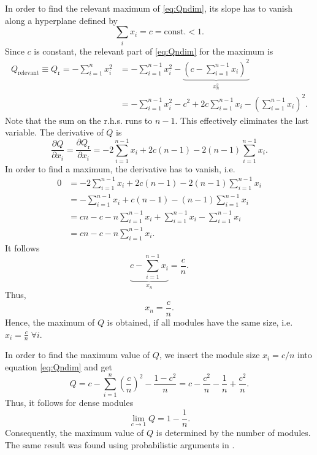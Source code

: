\documentclass[openright,twoside,headsepline]{scrbook}
\begin{document}
In order to find the relevant maximum of \eqref{eq:Qndim}, its slope has to vanish along a hyperplane defined by
\begin{equation}\label{qmehrdimbedingung}
\sum _i x_i = c = \text{const.} <1.
\end{equation}
%
Since $c$ is constant, the relevant part of \eqref{eq:Qndim} for the maximum is
\begin{align}
Q_{\text{relevant}}\equiv Q_\text{r}= -\sum _{i=1}^n x_i^2&=-\sum _{i=1}^{n-1} x_i^2- \underbrace{ \left( 
c-\sum _{i=1}^{n-1} x_i \right) ^2 }_{x_n^2} \label{eq:relevant_Q}\\
&= -\sum _{i=1}^{n-1} x_i^2 - c^2 + 2c\sum _{i=1}^{n-1} x_i -\left( \sum _{i=1}^{n-1} x_i \right) ^2. \nonumber
\end{align}
Note that the sum on the r.h.s. runs to $n-1$.
This effectively eliminates the last variable.
The derivative of $Q$ is
\begin{equation}
\frac{\partial Q}{\partial x_i}= \frac{\partial Q_\text{r}}{\partial x_i}=- 2\sum _{i=1}^{n-1} x_i + 2c(n-1)-2 (n-1) \sum _{i=1}^{n-1} x_i.
\end{equation}
%
In order to find a maximum, the derivative has to vanish, i.e.
\begin{align*}
0&=- 2\sum _{i=1}^{n-1} x_i + 2c(n-1)-2 (n-1) \sum _{i=1}^{n-1} x_i \\
&=- \sum _{i=1}^{n-1} x_i + c(n-1) - (n-1) \sum _{i=1}^{n-1} x_i \\
 &= cn-c-n\sum _{i=1}^{n-1} x_i +\sum _{i=1}^{n-1} x_i -\sum _{i=1}^{n-1} x_i\\
 &= cn-c-n\sum _{i=1}^{n-1} x_i .
\end{align*}
It follows
\[
\underbrace{c-\sum _{i=1}^{n-1} x_i}_{x_n} =\frac{c}{n}.
\]
Thus,
\begin{equation}
x_n=\frac{c}{n}.
\end{equation}
Hence, the maximum of $Q$ is obtained, if all modules have the same size, i.e. $x_i=\frac{c}{n} \; \forall i$.

In order to find the maximum value of $Q$, we insert the module size $x_i=c/n$ into equation \eqref{eq:Qndim} and get
\[
Q=c-\sum _{i=1} ^n \left( \frac{c}{n} \right) ^2 - \frac{1-c^2}{n}=c-\frac{c^2}{n}-\frac{1}{n}+\frac{c^2}{n}.
\]
Thus, it follows for dense modules
\begin{equation}
\lim _{c\rightarrow 1}Q=1-\frac{1}{n}.
\end{equation}
Consequently, the maximum value of $Q$ is determined by the number of modules.
The same result was found using probabilistic arguments in \citep{Good2010}.
\end{document}
